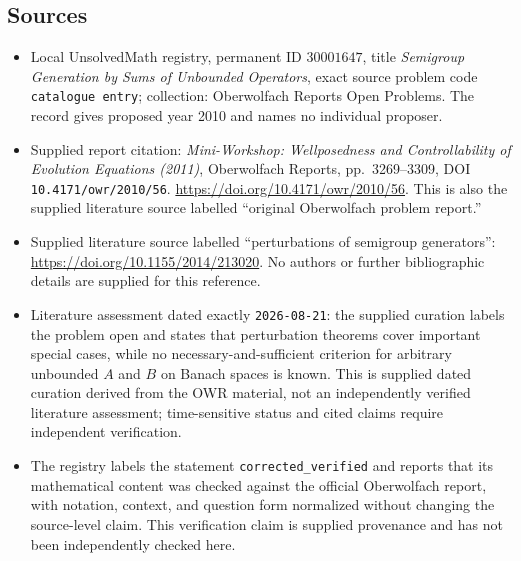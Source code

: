 \documentclass[11pt]{article}
\begin{document}
\subsection{Sources}
\begin{itemize}
\item Local UnsolvedMath registry, permanent ID \(30001647\), title \emph{Semigroup Generation by Sums of Unbounded Operators}, exact source problem code \texttt{catalogue entry}; collection: Oberwolfach Reports Open Problems. The record gives proposed year 2010 and names no individual proposer.
\item Supplied report citation: \emph{Mini-Workshop: Wellposedness and Controllability of Evolution Equations (2011)}, Oberwolfach Reports, pp.~3269--3309, DOI \texttt{10.4171/owr/2010/56}. \url{https://doi.org/10.4171/owr/2010/56}. This is also the supplied literature source labelled ``original Oberwolfach problem report.''
\item Supplied literature source labelled ``perturbations of semigroup generators'': \url{https://doi.org/10.1155/2014/213020}. No authors or further bibliographic details are supplied for this reference.
\item Literature assessment dated exactly \texttt{2026-08-21}: the supplied curation labels the problem open and states that perturbation theorems cover important special cases, while no necessary-and-sufficient criterion for arbitrary unbounded \(A\) and \(B\) on Banach spaces is known. This is supplied dated curation derived from the OWR material, not an independently verified literature assessment; time-sensitive status and cited claims require independent verification.
\item The registry labels the statement \texttt{corrected\_verified} and reports that its mathematical content was checked against the official Oberwolfach report, with notation, context, and question form normalized without changing the source-level claim. This verification claim is supplied provenance and has not been independently checked here.
\end{itemize}
\end{document}
